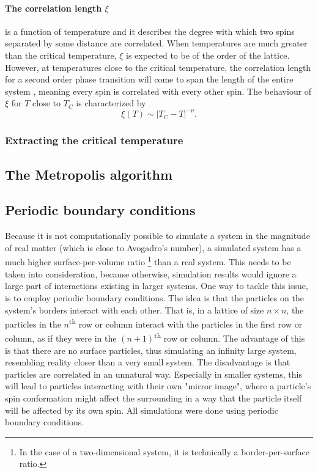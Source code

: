 \documentclass[10pt,a4paper]{article}
\begin{document}
\paragraph{The correlation length $\xi$}is a function of temperature and it describes the degree with which two spins separated by some distance are correlated. When temperatures are much greater than the critical temperature, $\xi$ is expected to be of the order of the lattice. However, at temperatures close to the critical temperature, the correlation length for a second order phase transition will come to span the length of the entire system \cite{Problem_set_4}, meaning every spin is correlated with every other spin. The behaviour of $\xi$ for $T$ close to $T_C$ is characterized by
\begin{equation}
\xi(T)\sim \left| T_C-T \right|^{-\nu}.
\end{equation}

\subsubsection{Extracting the critical temperature}
\subsection{The Metropolis algorithm}

\subsection{Periodic boundary conditions}
Because it is not computationally possible to simulate a system in the magnitude of real matter (which is close to Avogadro's number), a simulated system has a much higher surface-per-volume ratio \footnote{In the case of a two-dimensional system, it is technically a border-per-surface ratio.} than a real system. This needs to be taken into consideration, because otherwise, simulation results would ignore a large part of interactions existing in larger systems. One way to tackle this issue, is to employ periodic boundary conditions. The idea is that the particles on the system's borders interact with each other. That is, in a lattice of size $n\times n$, the particles in the $n$\textsuperscript{th} row or column interact with the particles in the first row or column, as if they were in the  $(n+1)$\textsuperscript{th} row or column. The advantage of this is that there are no surface particles, thus simulating an infinity large system, resembling reality closer than a very small system. The disadvantage is that particles are correlated in an unnatural way. Especially in smaller systems, this will lead to particles interacting with their own "mirror image", where a particle's spin conformation might affect the surrounding in a way that the particle itself will be affected by its own spin.
All simulations were done using periodic boundary conditions.
\end{document}
